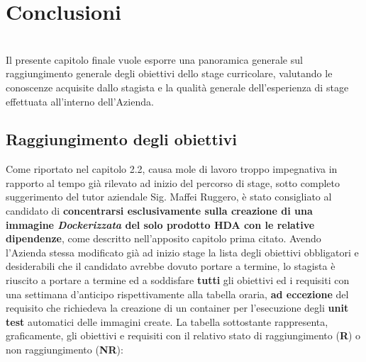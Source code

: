 
\chapter{Conclusioni}
\label{cap:conclusioni}
\\
Il presente capitolo finale vuole esporre una panoramica generale sul raggiungimento generale degli obiettivi dello stage curricolare, valutando le conoscenze acquisite dallo stagista e la qualità generale dell'esperienza di stage effettuata all'interno dell'Azienda.
\section{Raggiungimento degli obiettivi}
Come riportato nel capitolo 2.2, causa mole di lavoro troppo impegnativa in rapporto al tempo già rilevato ad inizio del percorso di stage, sotto completo suggerimento del tutor aziendale Sig. Maffei Ruggero, è stato consigliato al candidato di \textbf{concentrarsi esclusivamente sulla creazione di una immagine \textit{Dockerizzata} del solo prodotto HDA con le relative dipendenze}, come descritto nell'apposito capitolo prima citato.
Avendo l'Azienda stessa modificato già ad inizio stage la lista degli obiettivi obbligatori e desiderabili che il candidato avrebbe dovuto portare a termine, lo stagista è riuscito a portare a termine ed a soddisfare \textbf{tutti} gli obiettivi ed i requisiti con una settimana d'anticipo rispettivamente alla tabella oraria, \textbf{ad eccezione} del requisito che richiedeva la creazione di un container per l'esecuzione degli \textbf{unit test} automatici delle immagini create. La tabella sottostante rappresenta, graficamente, gli obiettivi e requisiti con il relativo stato di raggiungimento (\textbf{R}) o non raggiungimento (\textbf{NR}):
\newpage

